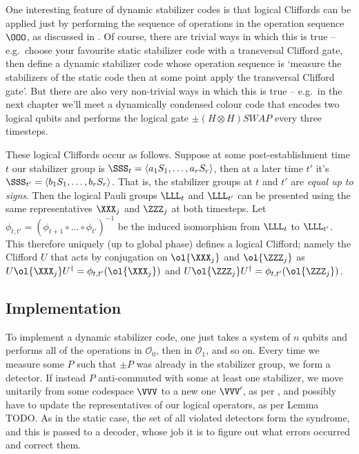 One interesting feature of dynamic stabilizer codes is that logical Cliffords can be applied just by performing the sequence of operations in the operation sequence $\OOO$, as discussed in .
Of course, there are trivial ways in which this is true -- e.g.\ choose your favourite static stabilizer code with a transversal Clifford gate, then define a dynamic stabilizer code whose operation sequence is `measure the stabilizers of the static code then at some point apply the transversal Clifford gate'.
But there are also very non-trivial ways in which this is true -- e.g.\ in the next chapter we'll meet a dynamically condensed colour code that encodes two logical qubits and performs the logical gate $\pm (H \otimes H)SWAP$ every three timesteps.

These logical Cliffords occur as follows.
Suppose at some post-establishment time $t$ our stabilizer group is $\SSS_t = \langle a_1 S_1, \ldots, a_r S_r \rangle$, then at a later time $t'$ it's $\SSS_{t'} = \langle b_1 S_1, \ldots, b_r S_r \rangle$.
That is, the stabilizer groups at $t$ and $t'$ are \textit{equal up to signs}.
Then the logical Pauli groups $\LLL_t$ and $\LLL_{t'}$ can be presented using the same representatives $\XXX_j$ and $\ZZZ_j$ at both timesteps.
Let $\phi_{t, t'} = (\phi_{t+1} \circ \ldots \circ \phi_{t'})^{-1}$ be the induced isomorphism from $\LLL_{t}$ to $\LLL_{t'}$.
This therefore uniquely (up to global phase) defines a logical Clifford; namely the Clifford $U$ that acts by conjugation on $\ol{\XXX_j}$ and $\ol{\ZZZ_j}$ as $U\ol{\XXX_j} U^\dagger = \phi_{t,t'}(\ol{\XXX_j})$ and $U\ol{\ZZZ_j} U^\dagger = \phi_{t,t'}(\ol{\ZZZ_j})$.

\subsection{Implementation}

To implement a dynamic stabilizer code, one just takes a system of $n$ qubits and performs all of the operations in $\mathcal{O}_0$, then in $\mathcal{O}_1$, and so on.
Every time we measure some $P$ such that $\pm P$ was already in the stabilizer group, we form a detector.
If instead $P$ anti-commuted with some at least one stabilizer, we move unitarily from some codespace $\VVV$ to a new one $\VVV'$, as per , and possibly have to update the representatives of our logical operators, as per Lemma TODO.
As in the static case, the set of all violated detectors form the syndrome, and this is passed to a decoder, whose job it is to figure out what errors occurred and correct them.

